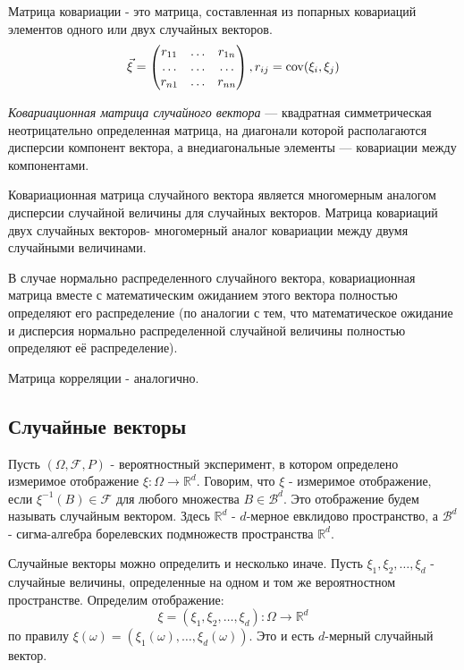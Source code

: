 \begin{definition}
	Матрица ковариации - это матрица, составленная из попарных ковариаций элементов одного или двух случайных векторов.
	\[
	\vec{\xi} =
	\begin{pmatrix}
		r_{11} & \dots & r_{1n} \\
		\dots  & \dots & \dots \\
		r_{n1} & \dots & r_{nn}
	\end{pmatrix},
	r_{ij} = \operatorname{\mathop{cov}} (\xi_i, \xi_j)
	\]
	
	\textit{Ковариационная матрица случайного вектора} — квадратная симметрическая неотрицательно определенная матрица, на диагонали которой располагаются дисперсии компонент вектора, а внедиагональные элементы — ковариации между компонентами.
	
	Ковариационная матрица случайного вектора является многомерным аналогом дисперсии случайной величины для случайных векторов. Матрица ковариаций двух случайных векторов- многомерный аналог ковариации между двумя случайными величинами.
	
	В случае нормально распределенного случайного вектора, ковариационная матрица вместе с математическим ожиданием этого вектора полностью определяют его распределение (по аналогии с тем, что математическое ожидание и дисперсия нормально распределенной случайной величины полностью определяют её распределение).
\end{definition}

\begin{remark}
	Матрица корреляции - аналогично.
\end{remark}

\subsection{Случайные векторы}

Пусть $(\Omega, \mathcal{F}, P)$ - вероятностный эксперимент, в котором определено измеримое отображение $\xi: \Omega \to \mathbb{R}^d$. Говорим, что $\xi$ - измеримое отображение, если $\xi^{-1}(B) \in \mathcal{F}$ для любого множества $B \in \mathcal{B}^d$. Это отображение будем называть случайным вектором. Здесь $\mathbb{R}^d$ - $d$-мерное евклидово пространство, а $\mathcal{B}^d$ - сигма-алгебра борелевских подмножеств пространства $\mathbb{R}^d$.

Случайные векторы можно определить и несколько иначе. Пусть $\xi_1, \xi_2, \dots, \xi_d$ - случайные величины, определенные на одном и том же вероятностном пространстве. Определим отображение:
\[ \xi = (\xi_1, \xi_2, \dots, \xi_d) : \Omega \to \mathbb{R}^d \]
по правилу $\xi (\omega) = (\xi_1(\omega), \dots, \xi_d (\omega))$. Это и есть $d$-мерный случайный вектор.

